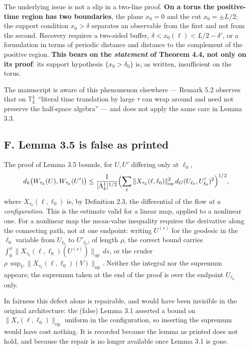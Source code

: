 \documentclass[11pt]{article}
\begin{document}
The underlying issue is not a slip in a two-line proof. \textbf{On a torus the
positive-time region has two boundaries}, the plane $x_0=0$ and the cut
$x_0=\pm L/2$; the support condition $x_0>\delta$ separates an observable from the
first and not from the second. Recovery requires a two-sided buffer,
$\delta<x_0(\ell)<L/2-\delta'$, or a formulation in terms of periodic distance and
distance to the complement of the positive region. \textbf{This bears on the
\emph{statement} of Theorem 4.4, not only on its proof}: its support hypothesis
$\{x_0>\delta_0\}$ is, as written, insufficient on the torus.

The manuscript is aware of this phenomenon elsewhere --- Remark 5.2 observes that on
$\mathbb T^4_L$ ``literal time translation by large $\tau$ can wrap around and need
not preserve the half-space algebra'' --- and does not apply the same care in
Lemma 3.3.

\subsection{F. Lemma 3.5 is false as printed}

The proof of Lemma 3.5 bounds, for $U,U'$ differing only at $\ell_0$,
\[
d_k\bigl(W_{\tau_k}(U),W_{\tau_k}(U')\bigr)\le
\frac{1}{|\Lambda^1_k|^{1/2}}
\Bigl(\sum_{\ell}\|X_{\tau_k}(\ell,\ell_0)\|_{\mathrm{op}}^2\,
d_G(U_{\ell_0},U'_{\ell_0})^2\Bigr)^{1/2},
\]
where $X_{\tau_k}(\ell,\ell_0)$ is, by Definition 2.3, the differential of the flow
\emph{at a configuration}. This is the estimate valid for a linear map, applied to a
nonlinear one. For a nonlinear map the mean-value inequality requires the derivative
along the connecting path, not at one endpoint: writing $U^{(s)}$ for the geodesic in
the $\ell_0$ variable from $U_{\ell_0}$ to $U'_{\ell_0}$, of length $\rho$, the
correct bound carries
$\int_0^{\rho}\|X_{\tau_k}(\ell,\ell_0)(U^{(s)})\|_{\mathrm{op}}\,ds$, or the cruder
$\rho\,\sup_V\|X_{\tau_k}(\ell,\ell_0)(V)\|_{\mathrm{op}}$. Neither the integral nor
the supremum appears; the supremum taken at the end of the proof is over the endpoint
$U_{\ell_0}$ only.

In fairness this defect alone is repairable, and would have been invisible in the
original architecture: the (false) Lemma 3.1 asserted a bound on
$\|X_\tau(\ell,\ell_0)\|_{\mathrm{op}}$ uniform in the configuration, so inserting the
supremum would have cost nothing. It is recorded because the lemma as printed does not
hold, and because the repair is no longer available once Lemma 3.1 is gone.
\end{document}
